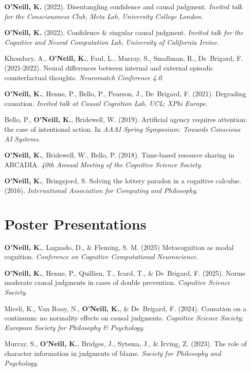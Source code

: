 \textbf{O'Neill, K.} (2022). Disentangling confidence and causal
judgment. \emph{Invited talk for the Consciousness Club, Meta Lab,
University College London}.

\textbf{O'Neill, K.} (2022). Confidence \& singular causal
judgment. \emph{Invited talk for the Cognitive and Neural
Computation Lab, University of California Irvine}.

Khoudary, A., \textbf{O’Neill, K.}, Faul, L., Murray, S., Smallman,
R., De~Brigard, F. (2021-2022). Neural differences between internal
and external episodic counterfactual thoughts. \emph{Neuromatch
Conference 4.0}.

\textbf{O'Neill, K.}, Henne, P., Bello, P., Pearson, J., De~Brigard,
F. (2021). Degrading causation. \emph{Invited talk at Causal
Cognition Lab, UCL}; \emph{XPhi Europe}.

Bello, P., \textbf{O'Neill, K.}, Bridewell, W. (2019). Artificial
agency requires attention: the case of intentional action. In
\emph{AAAI Spring Symposium: Towards Conscious AI Systems}.

\textbf{O'Neill, K.}, Bridewell, W., Bello, P. (2018). Time-based
resource sharing in ARCADIA. \emph{40th Annual Meeting of the
Cognitive Science Society}.

\textbf{O’Neill, K.}, Bringsjord, S. Solving the lottery paradox in
a cognitive calculus. (2016). \emph{International Association for
Computing and Philosophy}.


\line\section{Poster Presentations}

\textbf{O'Neill, K.}, Lagnado, D., \& Fleming, S. M. (2025)
Metacognition as modal cognition. \emph{Conference on Cognitive
Computational Neuroscience}.

\textbf{O'Neill, K.}, Henne, P., Quillien, T., Icard, T., \&
De~Brigard, F. (2025). Norms moderate causal judgments in cases of
double prevention. \emph{Cognitive Science Society}.

Miceli, K., Van Rooy, N., \textbf{O'Neill, K.}, \& De~Brigard,
F. (2024). Causation on a continuum: no normality effects on causal
judgments. \emph{Cognitive Science Society}; \emph{European Society
for Philosophy \& Psychology}.

Murray, S., \textbf{O’Neill, K.}, Bridges, J., Sytsma, J., \& Irving,
Z. (2023). The role of character information in judgments of
blame. \emph{Society for Philosophy and Psychology}.

